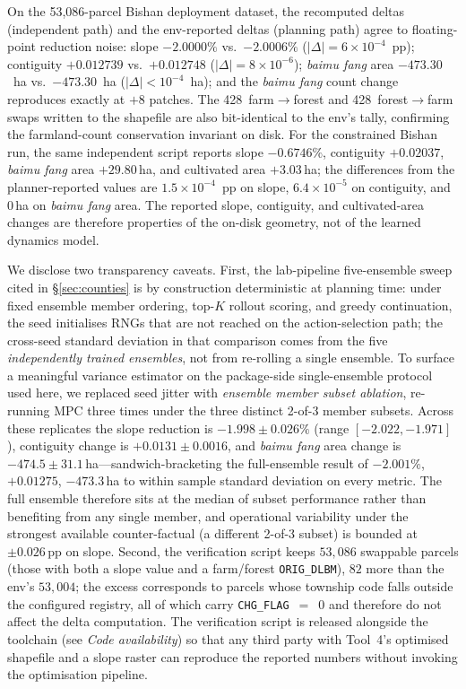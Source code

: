 \documentclass[11pt]{article}
\begin{document}
On the 53{,}086-parcel Bishan deployment dataset, the recomputed deltas (independent path) and the env-reported deltas (planning path) agree to floating-point reduction noise: slope $-2.0000\%$ vs.\ $-2.0006\%$ ($|\Delta|{=}6{\times}10^{-4}$~pp); contiguity $+0.012739$ vs.\ $+0.012748$ ($|\Delta|{=}8{\times}10^{-6}$); \textit{baimu fang} area $-473.30$~ha vs.\ $-473.30$~ha ($|\Delta|{<}10^{-4}$~ha); and the \textit{baimu fang} count change reproduces exactly at $+8$ patches. The 428~farm$\rightarrow$forest and 428~forest$\rightarrow$farm swaps written to the shapefile are also bit-identical to the env's tally, confirming the farmland-count conservation invariant on disk. For the constrained Bishan run, the same independent script reports slope $-0.6746\%$, contiguity $+0.02037$, \textit{baimu fang} area $+29.80$\,ha, and cultivated area $+3.03$\,ha; the differences from the planner-reported values are $1.5{\times}10^{-4}$~pp on slope, $6.4{\times}10^{-5}$ on contiguity, and $0$\,ha on \textit{baimu fang} area. The reported slope, contiguity, and cultivated-area changes are therefore properties of the on-disk geometry, not of the learned dynamics model.

We disclose two transparency caveats. First, the lab-pipeline five-ensemble sweep cited in \S\ref{sec:counties} is by construction deterministic at planning time: under fixed ensemble member ordering, top-$K$ rollout scoring, and greedy continuation, the seed initialises RNGs that are not reached on the action-selection path; the cross-seed standard deviation in that comparison comes from the five \emph{independently trained ensembles}, not from re-rolling a single ensemble. To surface a meaningful variance estimator on the package-side single-ensemble protocol used here, we replaced seed jitter with \emph{ensemble member subset ablation}, re-running MPC three times under the three distinct 2-of-3 member subsets. Across these replicates the slope reduction is $-1.998 \pm 0.026\%$ (range $[-2.022, -1.971]$), contiguity change is $+0.0131 \pm 0.0016$, and \textit{baimu fang} area change is $-474.5 \pm 31.1$\,ha---sandwich-bracketing the full-ensemble result of $-2.001\%$, $+0.01275$, $-473.3$\,ha to within sample standard deviation on every metric. The full ensemble therefore sits at the median of subset performance rather than benefiting from any single member, and operational variability under the strongest available counter-factual (a different 2-of-3 subset) is bounded at $\pm 0.026$\,pp on slope. Second, the verification script keeps $53{,}086$ swappable parcels (those with both a slope value and a farm/forest \texttt{ORIG\_DLBM}), $82$ more than the env's $53{,}004$; the excess corresponds to parcels whose township code falls outside the configured registry, all of which carry \texttt{CHG\_FLAG}~$=$~$0$ and therefore do not affect the delta computation. The verification script is released alongside the toolchain (see \emph{Code availability}) so that any third party with Tool~4's optimised shapefile and a slope raster can reproduce the reported numbers without invoking the optimisation pipeline.
\end{document}

